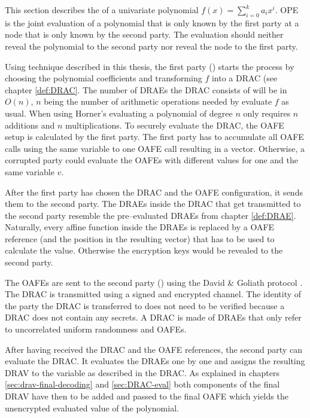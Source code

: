 %
%
\label{sec:OPE}

This section describes the  of a
univariate polynomial $f(x) = \sum_{i=0}^k a_ix^i$. OPE is the joint evaluation
of a polynomial that is only known by the first party at a node that is only
known by the second party. The evaluation should neither reveal the polynomial
to the second party nor reveal the node to the first party.

Using technique described in this thesis, the first party (\JWpOne{}) starts the
process by choosing the polynomial coefficients and transforming  $f$ into a
DRAC (see chapter \ref{def:DRAC}. The number of DRAEs the DRAC consists of will
be in $O(n)$, $n$ being the number of arithmetic operations needed by evaluate
$f$ as usual. When using Horner's \cite{cormen01} evaluating a polynomial of
degree $n$ only requires $n$ additions and $n$ multiplications. To securely
evaluate the DRAC, the OAFE setup is calculated by the first party. The first
party has to accumulate all OAFE calls using the same variable to one OAFE call
resulting in a vector. Otherwise, a corrupted party could evaluate the OAFEs
with different values for one and the same variable $v$.

After the first party has chosen the DRAC and the OAFE configuration, it sends
them to the second party. The DRAEs inside the DRAC that get transmitted to the
second party resemble the pre--evaluated DRAEs from chapter \ref{def:DRAE}.
Naturally, every affine function inside the DRAEs is replaced by a OAFE
reference (and the position in the resulting vector) that has to be used to
calculate the value. Otherwise the encryption keys would be revealed to the
second party.

The OAFEs are sent to the second party (\JWpTwo{}) using the David \& Goliath
protocol \cite{davidgoliath}. The DRAC is transmitted using a signed and
encrypted channel. The identity of the party the DRAC is transferred to does not
need to be verified because a DRAC does not contain any secrets. A DRAC is made
of DRAEs that only refer to uncorrelated uniform randomness and OAFEs.

After having received the DRAC and the OAFE references, the second party can
evaluate the DRAC\@. It evaluates the DRAEs one by one and assigns the resulting
DRAV to the variable as described in the DRAC\@. As explained in chapters
\ref{sec:drav-final-decoding} and \ref{sec:DRAC-eval} both components of the
final DRAV have then to be added and passed to the final OAFE which yields the
unencrypted evaluated value of the polynomial.


